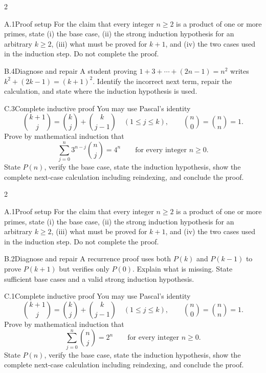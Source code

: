 \documentclass[9pt]{extarticle}
\begin{document}
\CoreWorkArea
\FormBreak
{}
\begin{multicols}{2}
\begin{CompactCoreProblem}{A.1}{Proof setup}
For the claim that every integer $n\ge2$ is a product of one or more primes, state (i) the base case, (ii) the strong induction hypothesis for an arbitrary $k\ge2$, (iii) what must be proved for $k+1$, and (iv) the two cases used in the induction step. Do not complete the proof.
\end{CompactCoreProblem}
\begin{CompactCoreProblem}{B.4}{Diagnose and repair}
A student proving $1+3+\cdots+(2n-1)=n^2$ writes $k^2+(2k-1)=(k+1)^2$. Identify the incorrect next term, repair the calculation, and state where the induction hypothesis is used.
\end{CompactCoreProblem}
\end{multicols}
\begin{CompactCoreProblem}{C.3}{Complete inductive proof}
You may use Pascal's identity
\[
\binom{k+1}{j}=\binom{k}{j}+\binom{k}{j-1}
\quad(1\le j\le k),\qquad
\binom{n}{0}=\binom{n}{n}=1.
\]
Prove by mathematical induction that
\[
\sum_{j=0}^{n} 3^{n-j}\binom{n}{j}=4^n\qquad\text{for every integer }n\ge0.
\]
State $P(n)$, verify the base case, state the induction hypothesis, show the complete next-case calculation including reindexing, and conclude the proof.
\end{CompactCoreProblem}
\CoreWorkArea
\FormBreak
{}
\begin{multicols}{2}
\begin{CompactCoreProblem}{A.1}{Proof setup}
For the claim that every integer $n\ge2$ is a product of one or more primes, state (i) the base case, (ii) the strong induction hypothesis for an arbitrary $k\ge2$, (iii) what must be proved for $k+1$, and (iv) the two cases used in the induction step. Do not complete the proof.
\end{CompactCoreProblem}
\begin{CompactCoreProblem}{B.2}{Diagnose and repair}
A recurrence proof uses both $P(k)$ and $P(k-1)$ to prove $P(k+1)$ but verifies only $P(0)$. Explain what is missing. State sufficient base cases and a valid strong induction hypothesis.
\end{CompactCoreProblem}
\end{multicols}
\begin{CompactCoreProblem}{C.1}{Complete inductive proof}
You may use Pascal's identity
\[
\binom{k+1}{j}=\binom{k}{j}+\binom{k}{j-1}
\quad(1\le j\le k),\qquad
\binom{n}{0}=\binom{n}{n}=1.
\]
Prove by mathematical induction that
\[
\sum_{j=0}^{n}\binom{n}{j}=2^n\qquad\text{for every integer }n\ge0.
\]
State $P(n)$, verify the base case, state the induction hypothesis, show the complete next-case calculation including reindexing, and conclude the proof.
\end{CompactCoreProblem}
\end{document}
